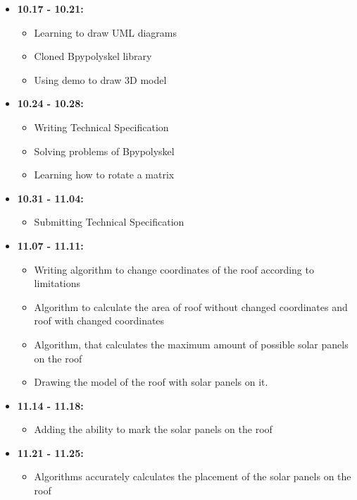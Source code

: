 \documentclass[a4paper,12pt,fleqn]{article}
\begin{document}
\begin{itemize}
    \item \textbf{10.17 - 10.21:}
    \begin{itemize}
        \item Learning to draw UML diagrams
        \item Cloned Bpypolyskel library
        \item Using demo to draw 3D model
    \end{itemize}
    
    \item \textbf{10.24 - 10.28:}
    \begin{itemize}
        \item Writing Technical Specification
        \item Solving problems of Bpypolyskel
        \item Learning how to rotate a matrix
    \end{itemize}
    
    \item \textbf{10.31 - 11.04:}
    \begin{itemize}
        \item Submitting Technical Specification
    \end{itemize}
    
    \item \textbf{11.07 - 11.11:}
    \begin{itemize}
        \item Writing algorithm to change coordinates of the roof according to limitations
        \item Algorithm to calculate the area of roof without changed coordinates and roof with changed coordinates
        \item Algorithm, that calculates the maximum amount of possible solar panels on the roof
        \item Drawing the model of the roof with solar panels on it.
    \end{itemize}
    
    \item \textbf{11.14 - 11.18:}
    \begin{itemize}
        \item Adding the ability to mark the solar panels on the roof
    \end{itemize}
    
    \item \textbf{11.21 - 11.25:}
    \begin{itemize}
        \item Algorithms accurately calculates the placement of the solar panels on the roof
    \end{itemize}
    

\end{itemize}
\end{document}
